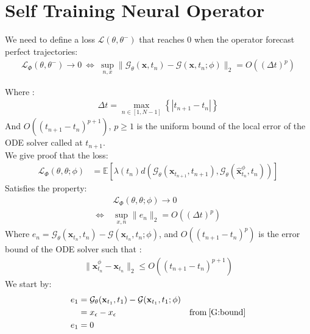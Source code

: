 \section{Self Training Neural Operator}

We need to define a loss $\mathcal{L}(\theta, \theta^{-})$ that reaches 0 when the operator forecast perfect trajectories:
\begin{align}
    \mathcal{L}_{\Phi} (\theta, \theta^{-}) \rightarrow 0 \: \Leftrightarrow \: \sup_{n, x} \lVert \mathcal{G}_{\theta} (\mathbf{x}, t_n) - \mathcal{G}(\mathbf{x}, t_n; \phi)\rVert_2 = O((\Delta t)^p)
\end{align}

\noindent Where : 
\begin{align}
\Delta t = \max_{n \in [1, N-1]} \left\{|t_{n+1} - t_n|\right\} \label{deltat:def}
\end{align}
\noindent And $O\left((t_{n+1} - t_n)^{p+1}\right)$, $p \geq 1$ is the uniform bound of the local error of the ODE solver called at $t_{n+1}$. \\

\noindent We give proof that the loss:  \label{app:ld}
\begin{align}
    \mathcal{L}_{\Phi}\left(\theta, \theta; \phi \right) &= \mathbb{E}\left[ \lambda(t_n) d \left(\mathcal{G}_{\theta}(\mathbf{x}_{t_{n+1}}, t_{n+1}), \mathcal{G}_{\theta}(\widehat{\mathbf{x}}_{t_{n}}^{\phi}, t_{n}) \right)\right]
\end{align} 
\noindent Satisfies the property:
\begin{align}
    & \mathcal{L}_{\Phi}\left(\theta, \theta; \phi \right) \rightarrow 0 \\
    \Leftrightarrow \:& \sup_{x, n} \lVert e_n \rVert_2 = O((\Delta t)^p) \label{prop:lphi}
\end{align}
\noindent Where $e_n = \mathcal{G}_{\theta}(\mathbf{x}_{t_n}, t_n) - \mathcal{G}(\mathbf{x}_{t_n}, t_n; \phi)$, and $O((t_{n+1} - t_n)^p)$ is the error bound of the ODE solver such that :
\begin{align}
    \lVert \widehat{\mathbf{x}}_{t_n}^{\phi} - \mathbf{x}_{t_n} \rVert_2 \leq O((t_{n+1} - t_n)^{p+1}) \label{O:def}
\end{align}
\noindent We start by:
\begin{align}
    e_1 &= \mathcal{G}_{\theta}(\mathbf{x}_{t_1}, t_1) - \mathcal{G}(\mathbf{x}_{t_1}, t_1; \phi) \\
    & = x_{\epsilon} - x_{\epsilon} & \text{from} \: \ref{G:bound} \\
    e_1 &= 0 \label{e1:zero}
\end{align}

